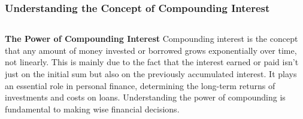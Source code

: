 \documentclass[5pt]{beamer}
\begin{document}
\begin{frame}
\frametitle{Understanding the Concept of Compounding Interest}
\begin{columns}
\begin{column}{0.7\textwidth}
\begin{block}{\textbf{The Power of Compounding Interest}}
Compounding interest is the concept that any amount of money invested or borrowed grows exponentially over time, not linearly. This is mainly due to the fact that the interest earned or paid isn't just on the initial sum but also on the previously accumulated interest. It plays an essential role in personal finance, determining the long-term returns of investments and costs on loans. Understanding the power of compounding is fundamental to making wise financial decisions.
\end{block}
\end{column}
\end{columns}
\end{frame}
\end{document}
